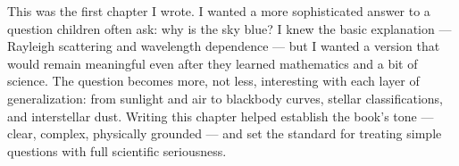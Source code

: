 \begin{commentary}
This was the first chapter I wrote. I wanted a more sophisticated answer to a question children often ask: why is the sky blue? I knew the basic explanation --- Rayleigh scattering and wavelength dependence --- but I wanted a version that would remain meaningful even after they learned mathematics and a bit of science. The question becomes more, not less, interesting with each layer of generalization: from sunlight and air to blackbody curves, stellar classifications, and interstellar dust. Writing this chapter helped establish the book's tone --- clear, complex, physically grounded --- and set the standard for treating simple questions with full scientific seriousness.
\end{commentary}